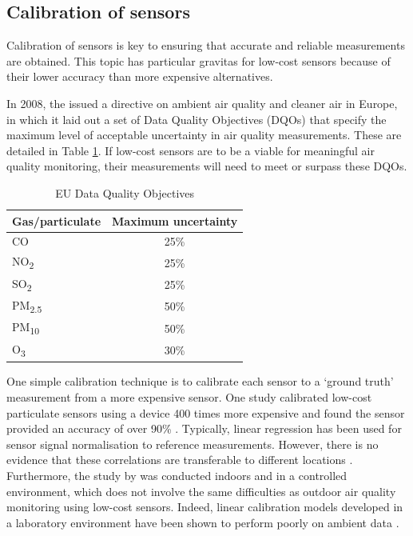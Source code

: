 \documentclass[11pt]{report}
\begin{document}
\subsection{Calibration of sensors}

Calibration of sensors is key to ensuring that accurate and reliable measurements are obtained. This topic has particular gravitas for low-cost sensors because of their lower accuracy than more expensive alternatives.

In 2008, the \cite{eudir2008airquality} issued a directive on ambient air quality and cleaner air in Europe, in which it laid out a set of Data Quality Objectives (DQOs) that specify the maximum level of acceptable uncertainty in air quality measurements. These are detailed in Table \ref{dataqualityobjectives}. If low-cost sensors are to be a viable for meaningful air quality monitoring, their measurements will need to meet or surpass these DQOs.


\begin{table}[!htbp]
  \centering
  \caption{EU Data Quality Objectives}
  \label{dataqualityobjectives}
  \begin{tabular}{ l c}
  \toprule
  Gas/particulate & Maximum uncertainty \\ \midrule
  CO & 25\% \\
  NO\textsubscript{2} & 25\% \\
  SO\textsubscript{2} & 25\% \\
  PM\textsubscript{2.5} & 50\% \\
  PM\textsubscript{10} & 50\% \\
  O\textsubscript{3} & 30\% \\ \bottomrule
  \end{tabular}
\end{table}

One simple calibration technique is to calibrate each sensor to a `ground truth' measurement from a more expensive sensor. One study calibrated low-cost particulate sensors using a device 400 times more expensive and found the sensor provided an accuracy of over 90\% \citep{thorpe2017RPimesh}. Typically, linear regression has been used for sensor signal normalisation to reference measurements. However, there is no evidence that these correlations are transferable to different locations \citep{Clements2017lowcostworkshop}. Furthermore, the study by \cite{thorpe2017RPimesh} was conducted indoors and in a controlled environment, which does not involve the same difficulties as outdoor air quality monitoring using low-cost sensors. Indeed, linear calibration models developed in a laboratory environment have been shown to perform poorly on ambient data \citep{Castell2017}.
\end{document}
